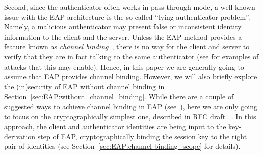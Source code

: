  
Second,
since the authenticator often works in pass-through mode,
a well-known issue with the EAP architecture is the so-called ``lying authenticator problem''.
Namely,
a malicious authenticator may present false or inconsistent identity information to the client and the server. 
Unless the EAP method provides a feature known as \emph{channel binding}~\cite{IETF:RFC6677:EAP-channel-binding},
there is no way for the client and server to verify that they are in fact talking to the same authenticator
(see \cite[§3]{IETF:RFC6677:EAP-channel-binding} for examples of attacks that this may enable).
Hence,
in this paper we are generally going to assume that EAP provides channel binding.
However,
we will also briefly explore the (in)security of EAP without channel binding in Section~\ref{sec:EAP:without_channel_binding}. 
While there are a couple of suggested ways to achieve channel binding in EAP (see~\cite[§4.1]{IETF:RFC6677:EAP-channel-binding}),
here we are only going to focus on the cryptographically simplest one,
described in RFC draft ~\cite{IETF:draft:EAP-channel-binding}. 
In this approach, 
the client and authenticator identities are being input to the key-derivation step of EAP,
cryptographically binding the session key to the right pair of identities (see Section~\ref{sec:EAP:channel-binding_scope} for details). 




